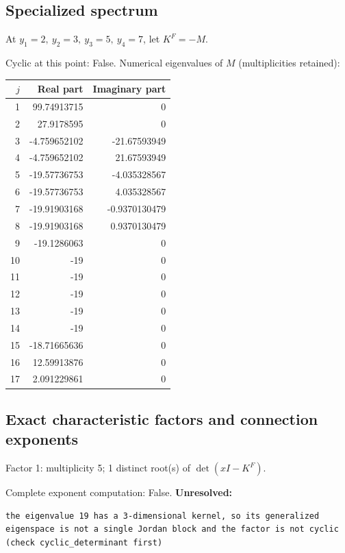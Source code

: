 \documentclass[10pt,a4paper]{article}
\newcommand{\fitmath}[1]{\sbox{\mathbox}{$\displaystyle #1$}\ifdim\wd\mathbox>\linewidth\resizebox{\linewidth}{!}{\usebox{\mathbox}}\else\usebox{\mathbox}\fi}
\begin{document}
\subsection*{Specialized spectrum}
At $y_1=2,\ y_2=3,\ y_3=5,\ y_4=7$, let $K^F=-M$.
\begin{center}\fitmath{\Delta=0}\end{center}
Cyclic at this point: False.
Numerical eigenvalues of $M$ (multiplicities retained):
\begin{center}\small\begin{tabular}{rrr}\toprule $j$ & Real part & Imaginary part\\\midrule
1 & 99.74913715 & 0\\
2 & 27.9178595 & 0\\
3 & -4.759652102 & -21.67593949\\
4 & -4.759652102 & 21.67593949\\
5 & -19.57736753 & -4.035328567\\
6 & -19.57736753 & 4.035328567\\
7 & -19.91903168 & -0.9370130479\\
8 & -19.91903168 & 0.9370130479\\
9 & -19.1286063 & 0\\
10 & -19 & 0\\
11 & -19 & 0\\
12 & -19 & 0\\
13 & -19 & 0\\
14 & -19 & 0\\
15 & -18.71665636 & 0\\
16 & 12.59913876 & 0\\
17 & 2.091229861 & 0\\
\bottomrule\end{tabular}\end{center}
\subsection*{Exact characteristic factors and connection exponents}
Factor 1: multiplicity 5; 1 distinct root(s) of $\det(xI-K^F)$.
\begin{center}\fitmath{\begin{aligned}p_{1}(x)&=x - 19\end{aligned}}\end{center}
Complete exponent computation: False.
\textbf{Unresolved:}

\begin{lstlisting}
the eigenvalue 19 has a 3-dimensional kernel, so its generalized eigenspace is not a single Jordan block and the factor is not cyclic (check cyclic_determinant first)
\end{lstlisting}
\end{document}
